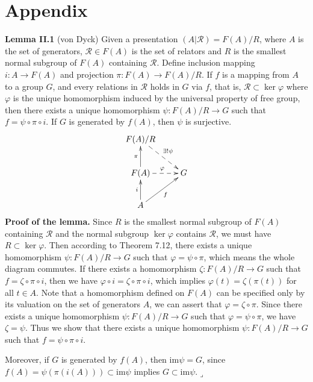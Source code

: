 \documentclass[12pt,letterpaper,boxed]{hmcpset}
\begin{document}
\section{Appendix}
\hypertarget{Lemma II.1}{}
\textbf{Lemma II.1} (von Dyck)
Given a presentation $(A|\mathscr{R})=F(A)/R$, where $A$ is the set of generators, $\mathscr{R}\in F(A)$ is the set of relators and $R$ is the smallest normal subgroup of $F(A)$ containing $\mathscr{R}$. Define inclusion mapping $i:A\to F(A)$ and projection $\pi:F(A)\to F(A)/R$. If $f$ is a mapping from $A$ to a group $G$, and every relations in $\mathscr{R}$ holds in $G$ via $f$, that is, $\mathscr{R}\subset\ker\varphi$ where $\varphi$ is the unique homomorphism induced by the universal property of free group, then there exists a unique homomorphism $\psi:F(A)/R\to G$ such that $f=\psi\circ\pi\circ i$. If $G$ is generated by $f(A)$, then $\psi$ is surjective.
\[\xymatrix{
	F(A)/R\ar@{-->}[rd]^{\exists!\psi}\\
	F(A)\ar@{-->}[r]^{\varphi}\ar[u]^{\pi} &G\\
	A\ar[ru]_{f}\ar[u]^{i}&    
}\]
\textbf{Proof of the lemma.} Since $R$ is the smallest normal subgroup of $F(A)$ containing $\mathscr{R}$ and the normal subgroup $\ker\varphi$ contains $\mathscr{R}$, we must have $R\subset\ker\varphi$. Then according to Theorem 7.12, there exists a unique homomorphism $\psi:F(A)/R\to G$ such that $\varphi=\psi\circ\pi$, which means the whole diagram commutes. If there exists a homomorphism $\zeta:F(A)/R\to G$ such that $f=\zeta\circ\pi\circ i$, then we have $\varphi\circ i=\zeta\circ\pi\circ i$, which implies $\varphi(t)= \zeta(\pi(t))$ for all $t\in A$. Note that a homomorphism  defined on $F(A)$ can be specified only by its valuation on the set of generators $A$, we can assert that $\varphi=\zeta\circ\pi$. Since there exists a unique homomorphism $\psi:F(A)/R\to G$ such that $\varphi=\psi\circ\pi$, we have $\zeta=\psi$. Thus we show that there exists a unique homomorphism $\psi:F(A)/R\to G$ such that $f=\psi\circ\pi\circ i$.

Moreover, if $G$ is generated by $f(A)$, then $\mathrm{im}\psi=G$, since $f(A)=\psi(\pi( i(A)))\subset\mathrm{im}\psi$ implies $G\subset\mathrm{im}\psi$.\hfill$\lrcorner$


\newpage



\end{document}
